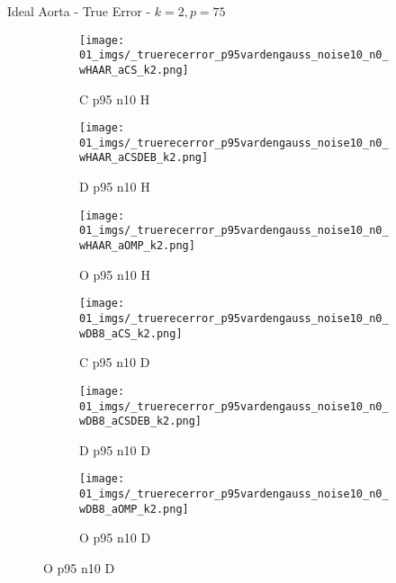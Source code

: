 \begin{frame}{Ideal Aorta - True Error - $k=2,p=75$}{}
\begin{figure}
\begin{subfigure}{0.13\textwidth}
\texttt{[image: 01\_imgs/\_truerecerror\_p95vardengauss\_noise10\_n0\_wHAAR\_aCS\_k2.png]}
\caption*{\tiny C p95 n10 H}
\end{subfigure}
\begin{subfigure}{0.13\textwidth}
\texttt{[image: 01\_imgs/\_truerecerror\_p95vardengauss\_noise10\_n0\_wHAAR\_aCSDEB\_k2.png]}
\caption*{\tiny D p95 n10 H}
\end{subfigure}
\begin{subfigure}{0.13\textwidth}
\texttt{[image: 01\_imgs/\_truerecerror\_p95vardengauss\_noise10\_n0\_wHAAR\_aOMP\_k2.png]}
\caption*{\tiny O p95 n10 H}
\end{subfigure}
\begin{subfigure}{0.13\textwidth}
\texttt{[image: 01\_imgs/\_truerecerror\_p95vardengauss\_noise10\_n0\_wDB8\_aCS\_k2.png]}
\caption*{\tiny C p95 n10 D}
\end{subfigure}
\begin{subfigure}{0.13\textwidth}
\texttt{[image: 01\_imgs/\_truerecerror\_p95vardengauss\_noise10\_n0\_wDB8\_aCSDEB\_k2.png]}
\caption*{\tiny D p95 n10 D}
\end{subfigure}
\begin{subfigure}{0.13\textwidth}
\texttt{[image: 01\_imgs/\_truerecerror\_p95vardengauss\_noise10\_n0\_wDB8\_aOMP\_k2.png]}
\caption*{\tiny O p95 n10 D}
\end{subfigure}

\vspace{5pt}


\end{figure}
\end{frame}

